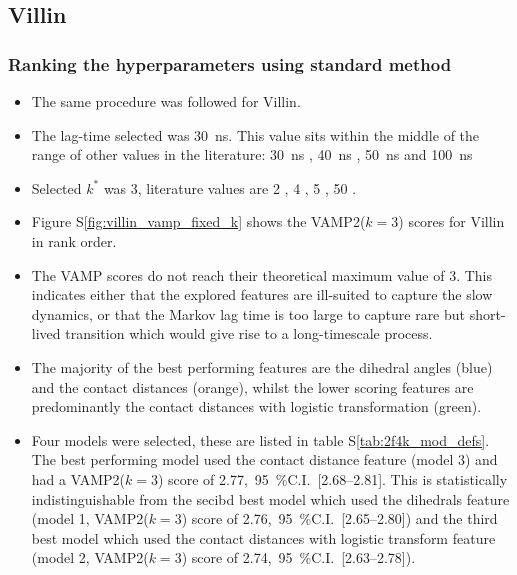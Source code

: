 \documentclass[journal=jacsat,manuscript=article]{achemso}
\newcommand{\numci}[3]{\num{#1},\ \SI{95}{\percent}C.I.\ [\numrange[range-phrase=---]{#2}{#3}]}
\newcommand*\sref[1]{%
    S\ref{#1}}
\begin{document}
\subsection{Villin}

\subsubsection{Ranking the hyperparameters using standard method}

\begin{itemize}
    \item The same procedure was followed for Villin. 
    \item The lag-time selected was \SI{30}{\nano\second}. This value sits within the middle of the range of other values in the literature:   \SI{30}{\nano\second} \cite{SAXS-guide2018, HTMD:_High2016}, \SI{40}{\nano\second} \cite{Computing_2019},  \SI{50}{\nano\second} \cite{Examining_2018, Variationa2018, Optimized_2016, Ward_Clust2017} and \SI{100}{\nano\second} \cite{suarez_what_2021, scherer_variational_2019}
    \item Selected $k^{*}$ was \num{3}, literature values are \num{2} \cite{Optimized_2016, Variationa2018}, \num{4} \cite{suarez_what_2021}, \num{5} \cite{scherer_variational_2019}, \num{50} \cite{Ward_Clust2017}. 
    \item Figure \sref{fig:villin_vamp_fixed_k} shows the VAMP2($k=3$) scores for Villin in rank order. 
    \item The VAMP scores do not reach their theoretical maximum value of \num{3}. This indicates either that the explored features are ill-suited to capture the slow dynamics, or that the Markov lag time is too large to capture rare but short-lived transition which would give rise to a long-timescale process.  
    \item The majority of the best performing features are the dihedral angles (blue) and the contact distances (orange), whilst the lower scoring features are predominantly the contact distances with logistic transformation (green). 
    \item Four models were selected, these are listed in table \sref{tab:2f4k_mod_defs}.  The best performing model used the contact distance feature (model 3) and had a VAMP2($k=3$) score of \numci{2.77}{2.68}{2.81}. This is statistically indistinguishable from the secibd best model which used the dihedrals feature (model 1, VAMP2($k=3$) score of \numci{2.76}{2.65}{2.80}) and the third  best model which used the contact distances with logistic transform feature (model 2, VAMP2($k=3$) score of \numci{2.74}{2.63}{2.78}). 
\end{itemize}
\end{document}
